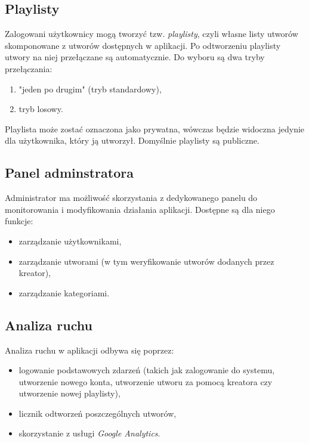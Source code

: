 \documentclass[11pt]{article}
\begin{document}
  \subsection{Playlisty}
  Zalogowani użytkownicy mogą tworzyć tzw. \textit{playlisty}, czyli własne listy utworów skomponowane z utworów dostępnych w aplikacji. Po odtworzeniu playlisty utwory na niej przełączane są automatycznie. Do wyboru są dwa tryby przełączania:
  \begin{enumerate}
    \item "jeden po drugim" (tryb standardowy),
    \item tryb losowy.
  \end{enumerate}
  
  Playlista może zostać oznaczona jako prywatna, wówczas będzie widoczna jedynie dla użytkownika, który ją utworzył. Domyślnie playlisty są publiczne.

  \subsection{Panel adminstratora}
  Administrator ma możliwość skorzystania z dedykowanego panelu do monitorowania i modyfikowania działania aplikacji. Dostępne są dla niego funkcje:

  \begin{itemize}
    \item zarządzanie użytkownikami,
    \item zarządzanie utworami (w tym weryfikowanie utworów dodanych przez kreator),
    \item zarządzanie kategoriami.
  \end{itemize}

  \subsection{Analiza ruchu}
  Analiza ruchu w aplikacji odbywa się poprzez:
  
  \begin{itemize}
    \item logowanie podstawowych zdarzeń (takich jak zalogowanie do systemu, utworzenie nowego konta, utworzenie utworu za pomocą kreatora czy utworzenie nowej playlisty),
    \item licznik odtworzeń poszczególnych utworów,
    \item skorzystanie z usługi \textit{Google Analytics}.
  \end{itemize}
\end{document}
